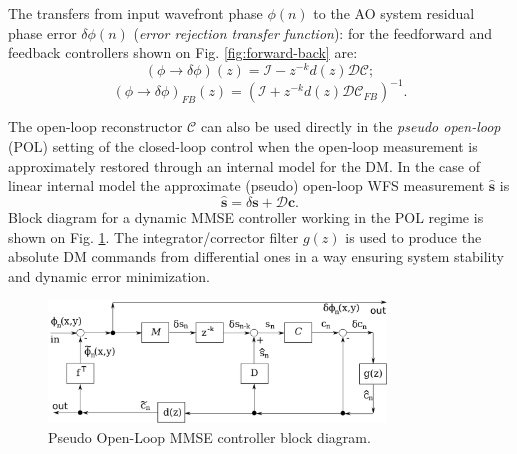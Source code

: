 The transfers from input wavefront phase $\phi(n)$ to the AO system
residual phase error $\delta \phi(n)$ (\emph{error rejection transfer
function}):  for the feedforward and
feedback controllers shown on Fig. \ref{fig:forward-back} are:
\begin{equation} \label{eq:forward-transfer}
	(\phi \rightarrow \delta \phi)(z) =
	\mathcal{I} -
	z^{-k} d(z) \mathcal{D} \mathcal{C};
\end{equation}
\begin{equation} \label{eq:feedback-transfer}
	(\phi \rightarrow \delta \phi)_{FB}(z) =
	( \mathcal{I}+z^{-k} d(z) \mathcal{D} \mathcal{C}_{FB} )^{-1}.
\end{equation}

The open-loop reconstructor $\mathcal{C}$ can also
be used directly in the \emph{pseudo open-loop}  (POL) setting of the closed-loop control when the open-loop
measurement is approximately restored
through an internal model for the DM. In the case of linear internal model the
approximate (pseudo) open-loop WFS measurement $\hat{\bm{s}}$ is
\begin{equation} \label{eq:wfs-restoration}
	\hat{\bm{s}} = \delta \bm{s} + \mathcal{D} \bm{c}.
\end{equation}
Block diagram for a dynamic MMSE controller working in the POL regime is
shown on Fig. \ref{fig:POL}. The integrator/corrector filter $g(z)$ is used to
produce the absolute DM
commands from differential ones in a way ensuring system stability and dynamic
error minimization.
\begin{figure}[htp]
\begin{center}
 \includegraphics[width = 0.8\textwidth]{POL.png}
\end{center}
\caption{Pseudo Open-Loop MMSE controller block diagram.}
\label{fig:POL}
\end{figure}


